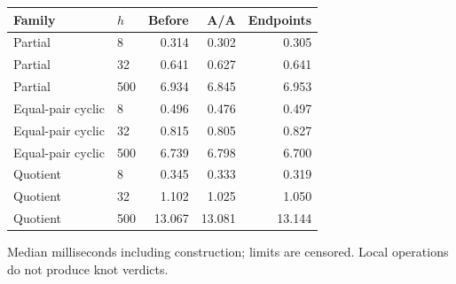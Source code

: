 \begin{center}\small
\begin{tabular}{@{}llrrr@{}}
\toprule
Family & $h$ & Before & A/A & Endpoints \\
\midrule
Partial & 8 & 0.314 & 0.302 & 0.305 \\
Partial & 32 & 0.641 & 0.627 & 0.641 \\
Partial & 500 & 6.934 & 6.845 & 6.953 \\
Equal-pair cyclic & 8 & 0.496 & 0.476 & 0.497 \\
Equal-pair cyclic & 32 & 0.815 & 0.805 & 0.827 \\
Equal-pair cyclic & 500 & 6.739 & 6.798 & 6.700 \\
Quotient & 8 & 0.345 & 0.333 & 0.319 \\
Quotient & 32 & 1.102 & 1.025 & 1.050 \\
Quotient & 500 & 13.067 & 13.081 & 13.144 \\
\bottomrule
\end{tabular}
\end{center}
Median milliseconds including construction; limits are censored. Local operations do not produce knot verdicts.
